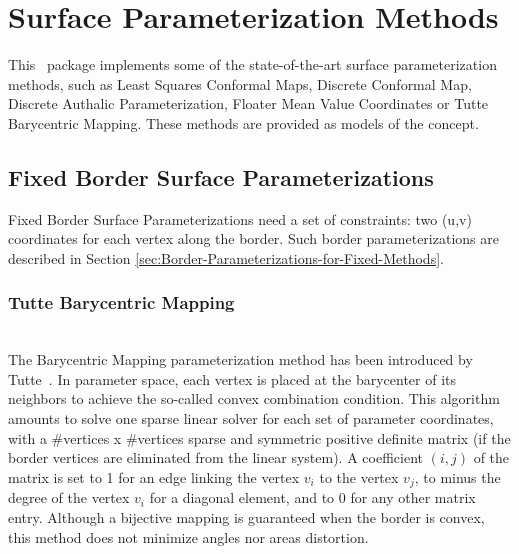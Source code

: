 \section{Surface Parameterization Methods}
\label{sec:Surface-Parameterization-Methods}

This \cgal\ package implements some of the state-of-the-art
surface parameterization methods, such as Least Squares Conformal Maps,
Discrete Conformal Map, Discrete Authalic
Parameterization, Floater Mean Value Coordinates or Tutte Barycentric
Mapping. These methods are provided as models of the
 concept.


\subsection{Fixed Border Surface Parameterizations}

Fixed Border Surface Parameterizations need a set of constraints: two
(u,v) coordinates for each vertex along the border.
Such border parameterizations are described in Section
\ref{sec:Border-Parameterizations-for-Fixed-Methods}.

\subsubsection{Tutte Barycentric Mapping}

  \\

The Barycentric Mapping parameterization method has been introduced by
Tutte~\cite{t-hdg-63}. In parameter space, each vertex is
placed at the barycenter of its neighbors to achieve the so-called
convex combination condition. This algorithm amounts to solve one
sparse linear solver for each set of parameter coordinates, with a
\#vertices x \#vertices sparse and symmetric positive definite matrix
(if the border vertices are eliminated from the linear system).
A coefficient $(i, j)$ of the matrix is set to 1 for an edge linking
the vertex $v_i$ to the vertex $v_j$, to minus the degree of the
vertex $v_i$ for a diagonal element, and to 0 for any other matrix
entry. Although a bijective mapping is guaranteed when the border is convex,
this method does not minimize angles nor areas distortion.

